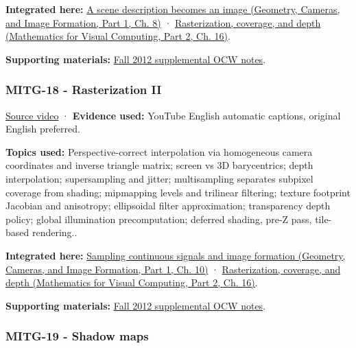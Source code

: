 \textbf{Integrated here:} \href{../03-Geometry-Cameras-and-Image-Formation-P01/main.pdf\#03-visual-computing-i-ch001-a-scene-description-becomes-an-image}{A scene description becomes an image (Geometry, Cameras, and Image Formation, Part 1, Ch. 8)} · \href{../02-Mathematics-for-Visual-Computing-P02/main.pdf\#03-visual-computing-i-ch012-rasterization-coverage-and-depth}{Rasterization, coverage, and depth (Mathematics for Visual Computing, Part 2, Ch. 16)}.

\textbf{Supporting materials:} \href{https://ocw.mit.edu/courses/6-837-computer-graphics-fall-2012/pages/lecture-notes/}{Fall 2012 supplemental OCW notes}.

\subsubsection{MITG-18 - Rasterization II}\label{04-visual-computing-ii-ch036-mitg-18---rasterization-ii}

\hypertarget{04-visual-computing-ii-ch036-mitg-18---rasterization-ii}{}

\href{https://www.youtube.com/watch?v=bZAu7QtyYvo}{Source video} · \textbf{Evidence used:} YouTube English automatic captions, original English preferred.

\textbf{Topics used:} Perspective-correct interpolation via homogeneous camera coordinates and inverse triangle matrix; screen vs 3D barycentrics; depth interpolation; supersampling and jitter; multisampling separates subpixel coverage from shading; mipmapping levels and trilinear filtering; texture footprint Jacobian and anisotropy; ellipsoidal filter approximation; transparency depth policy; global illumination precomputation; deferred shading, pre-Z pass, tile-based rendering..

\textbf{Integrated here:} \href{../03-Geometry-Cameras-and-Image-Formation-P01/main.pdf\#03-visual-computing-i-ch003-sampling-continuous-signals-and-image-formation}{Sampling continuous signals and image formation (Geometry, Cameras, and Image Formation, Part 1, Ch. 10)} · \href{../02-Mathematics-for-Visual-Computing-P02/main.pdf\#03-visual-computing-i-ch012-rasterization-coverage-and-depth}{Rasterization, coverage, and depth (Mathematics for Visual Computing, Part 2, Ch. 16)}.

\textbf{Supporting materials:} \href{https://ocw.mit.edu/courses/6-837-computer-graphics-fall-2012/pages/lecture-notes/}{Fall 2012 supplemental OCW notes}.

\subsubsection{MITG-19 - Shadow maps}\label{04-visual-computing-ii-ch036-mitg-19---shadow-maps}

